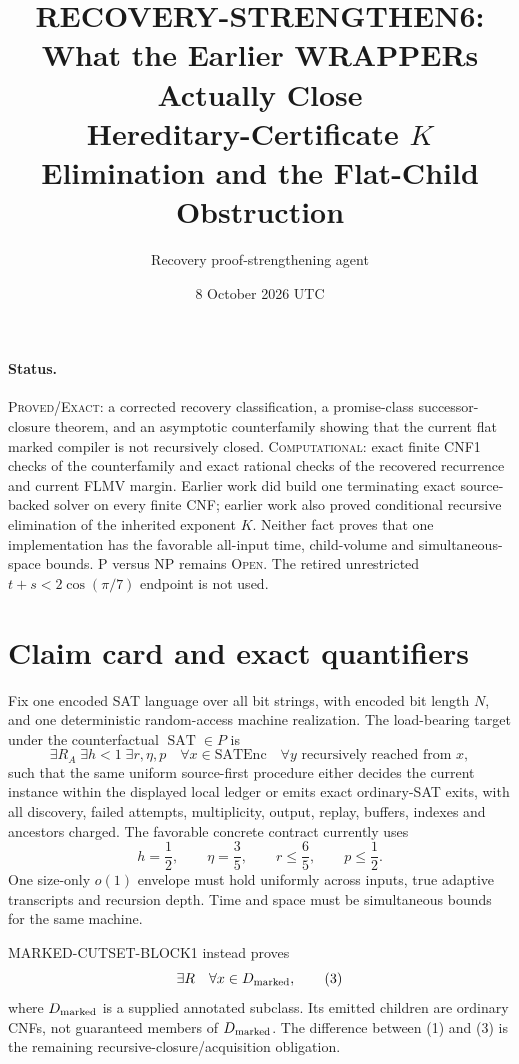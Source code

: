 \documentclass[11pt]{article}
\title{RECOVERY-STRENGTHEN6:\\What the Earlier WRAPPERs Actually Close\\Hereditary-Certificate $K$ Elimination and the Flat-Child Obstruction}
\author{Recovery proof-strengthening agent}
\date{8 October 2026 UTC}
\newcommand{\SAT}{\operatorname{SAT}}
\begin{document}
\sloppy\maketitle

\paragraph{Status.}
\textsc{Proved/Exact}: a corrected recovery classification, a promise-class
successor-closure theorem, and an asymptotic counterfamily showing that the
current flat marked compiler is not recursively closed.  \textsc{Computational}:
exact finite CNF1 checks of the counterfamily and exact rational checks of the
recovered recurrence and current FLMV margin.  Earlier work did build one
terminating exact source-backed solver on every finite CNF; earlier work also
proved conditional recursive elimination of the inherited exponent $K$.
Neither fact proves that one implementation has the favorable all-input
time, child-volume and simultaneous-space bounds.  P versus NP remains
\textsc{Open}.  The retired unrestricted $t+s<2\cos(\pi/7)$ endpoint is not
used.

\section{Claim card and exact quantifiers}
Fix one encoded SAT language over all bit strings, with encoded bit length
$N$, and one deterministic random-access machine realization.  The
load-bearing target under the counterfactual $\SAT\in P$ is
\[
 \exists R_A\;\exists h<1\;\exists r,\eta,p\quad
 \forall x\in\mathrm{SATEnc}\quad
 \forall y\text{ recursively reached from }x,                 \tag{1}
\]
such that the same uniform source-first procedure either decides the current
instance within the displayed local ledger or emits exact ordinary-SAT exits,
with all discovery, failed attempts, multiplicity, output, replay, buffers,
indexes and ancestors charged.  The favorable concrete contract currently
uses
\[
 h=\frac12,
 \qquad \eta=\frac35,
 \qquad r\le\frac65,
 \qquad p\le\frac12.                                         \tag{2}
\]
One size-only $o(1)$ envelope must hold uniformly across inputs, true adaptive
transcripts and recursion depth.  Time and space must be simultaneous bounds
for the same machine.

MARKED-CUTSET-BLOCK1 instead proves
\[
 \exists R\quad\forall x\in D_{\rm marked},                  \tag{3}
\]
where $D_{\rm marked}$ is a supplied annotated subclass.  Its emitted children
are ordinary CNFs, not guaranteed members of $D_{\rm marked}$.  The difference
between (1) and (3) is the remaining recursive-closure/acquisition obligation.
\end{document}
